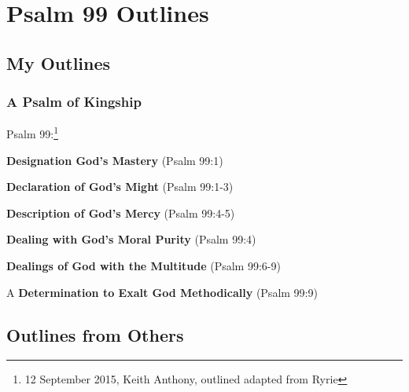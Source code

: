 \section{Psalm 99 Outlines}

\subsection{My Outlines}

\subsubsection{A Psalm of Kingship}
Psalm 99:\footnote{12 September 2015, Keith Anthony, outlined adapted from Ryrie}

\begin{compactenum}[I.]
    \item \textbf{Designation God's Mastery} (Psalm 99:1)
    \item \textbf{Declaration of God's Might} (Psalm 99:1-3)
    \item \textbf{Description of God's Mercy} (Psalm 99:4-5)
    \item \textbf{Dealing with God's Moral Purity} (Psalm 99:4)
    \item \textbf{Dealings of God with the Multitude} (Psalm 99:6-9)
    \item A \textbf{Determination to Exalt God Methodically} (Psalm 99:9)
\end{compactenum}

\subsection{Outlines from Others}